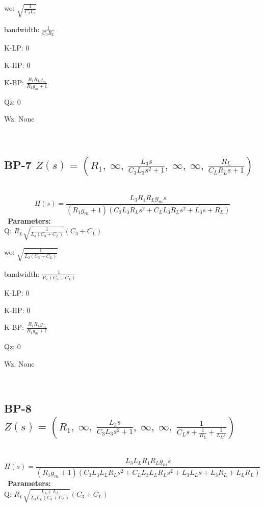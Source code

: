 \documentclass{article}
\begin{document}
wo: $\sqrt{\frac{1}{C_{3} L_{3}}}$\ 

bandwidth: $\frac{1}{C_{3} R_{L}}$\ 

K-LP: $0$\ 

K-HP: $0$\ 

K-BP: $\frac{R_{1} R_{L} g_{m}}{R_{1} g_{m} + 1}$\ 

Qz: $0$\ 

Wz: $\text{None}$\ 

\ 

\subsection{BP-7 $Z(s) = \left( R_{1}, \  \infty, \  \frac{L_{3} s}{C_{3} L_{3} s^{2} + 1}, \  \infty, \  \infty, \  \frac{R_{L}}{C_{L} R_{L} s + 1}\right)$ } \ 
\textbf{\[H(s) = \frac{L_{3} R_{1} R_{L} g_{m} s}{\left(R_{1} g_{m} + 1\right) \left(C_{3} L_{3} R_{L} s^{2} + C_{L} L_{3} R_{L} s^{2} + L_{3} s + R_{L}\right)}\] } \ 
\textbf{Parameters:}\\ 

Q: $R_{L} \sqrt{\frac{1}{L_{3} \left(C_{3} + C_{L}\right)}} \left(C_{3} + C_{L}\right)$\ 

wo: $\sqrt{\frac{1}{L_{3} \left(C_{3} + C_{L}\right)}}$\ 

bandwidth: $\frac{1}{R_{L} \left(C_{3} + C_{L}\right)}$\ 

K-LP: $0$\ 

K-HP: $0$\ 

K-BP: $\frac{R_{1} R_{L} g_{m}}{R_{1} g_{m} + 1}$\ 

Qz: $0$\ 

Wz: $\text{None}$\ 

\ 

\subsection{BP-8 $Z(s) = \left( R_{1}, \  \infty, \  \frac{L_{3} s}{C_{3} L_{3} s^{2} + 1}, \  \infty, \  \infty, \  \frac{1}{C_{L} s + \frac{1}{R_{L}} + \frac{1}{L_{L} s}}\right)$ } \ 
\textbf{\[H(s) = \frac{L_{3} L_{L} R_{1} R_{L} g_{m} s}{\left(R_{1} g_{m} + 1\right) \left(C_{3} L_{3} L_{L} R_{L} s^{2} + C_{L} L_{3} L_{L} R_{L} s^{2} + L_{3} L_{L} s + L_{3} R_{L} + L_{L} R_{L}\right)}\] } \ 
\textbf{Parameters:}\\ 

Q: $R_{L} \sqrt{\frac{L_{3} + L_{L}}{L_{3} L_{L} \left(C_{3} + C_{L}\right)}} \left(C_{3} + C_{L}\right)$\ 
\end{document}
